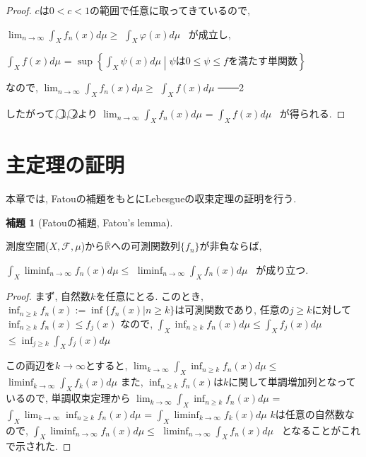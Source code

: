 \documentclass[12pt]{amsart}
\theoremstyle{definiton}
\newtheorem*{lemma*}{補題}
\begin{document}
\begin{proof}
$c$は$0<c<1$の範囲で任意に取ってきているので,

$\displaystyle \lim_{n \to \infty} \displaystyle \int_X f_n(x) d\mu \ge$
$\displaystyle \int_X \varphi(x) d\mu$ \ が成立し,

$\displaystyle \int_X f(x) d\mu$ = 
$\sup \left\{\displaystyle \int_X \psi(x) d\mu \middle| \psi \text{は} 0 \le \psi \le f \text{を満たす単関数} \right\}$

なので, 
$\displaystyle \lim_{n \to \infty} \displaystyle \int_X f_n(x) d\mu \ge$
$\displaystyle \int_X f(x) d\mu$ ───\textcircled{\scriptsize 2}

したがって, \textcircled{\scriptsize 1}, \textcircled{\scriptsize 2}より
$\displaystyle \lim_{n \to \infty} \displaystyle \int_X f_n(x) d\mu$ = 
$\displaystyle \int_X f(x) d\mu$ \ が得られる.
\end{proof}

\section{主定理の証明}
本章では, Fatouの補題をもとにLebesgueの収束定理の証明を行う.

\begin{lemma*}[Fatouの補題, Fatou's lemma]
\end{lemma*}
測度空間($X, \mathcal{F}, \mu$)から$\overline{\mathbb{R}}$への可測関数列$\{f_n\}$が非負ならば, 

$\displaystyle \int_X \displaystyle \liminf_{n \to \infty} f_n(x) d\mu \le$
$\displaystyle \liminf_{n \to \infty} \displaystyle \int_X f_n(x) d\mu$ \ が成り立つ.

\bigskip

\begin{proof}
まず, 自然数$k$を任意にとる. このとき,  
$\displaystyle \inf_{n \ge k} f_n(x) := \inf \{f_n(x) | n \ge k \}$は可測関数であり, 任意の$j \ge k$に対して
$\displaystyle \inf_{n \ge k} f_n(x) \le f_j(x)$ なので, 
$\displaystyle \int_X \displaystyle \inf_{n \ge k} f_n(x) d\mu \le \displaystyle \int_X f_j(x) d\mu$
$ \le \displaystyle \inf_{j \ge k} \displaystyle \int_X f_j(x) d\mu$

この両辺を$k \to \infty$とすると, 
$\displaystyle \lim_{k \to \infty} \displaystyle \int_X \displaystyle \inf_{n \ge k} f_n(x) d\mu \le$
$\displaystyle \liminf_{k \to \infty} \displaystyle \int_X f_k(x) d\mu$
また, $\displaystyle \inf_{n \ge k} f_n(x)$は$k$に関して単調増加列となっているので, 単調収束定理から
$\displaystyle \lim_{k \to \infty} \displaystyle \int_X \displaystyle \inf_{n \ge k} f_n(x) d\mu$ = 
$\displaystyle \int_X \displaystyle \lim_{k \to \infty} \displaystyle \inf_{n \ge k} f_n(x) d\mu$ = 
$\displaystyle \int_X \displaystyle \liminf_{k \to \infty} f_k(x) d\mu$
$k$は任意の自然数なので, $\displaystyle \int_X \displaystyle \liminf_{n \to \infty} f_n(x) d\mu \le$
$\displaystyle \liminf_{n \to \infty} \displaystyle \int_X f_n(x) d\mu$ \ となることがこれで示された.
\end{proof}
\end{document}

